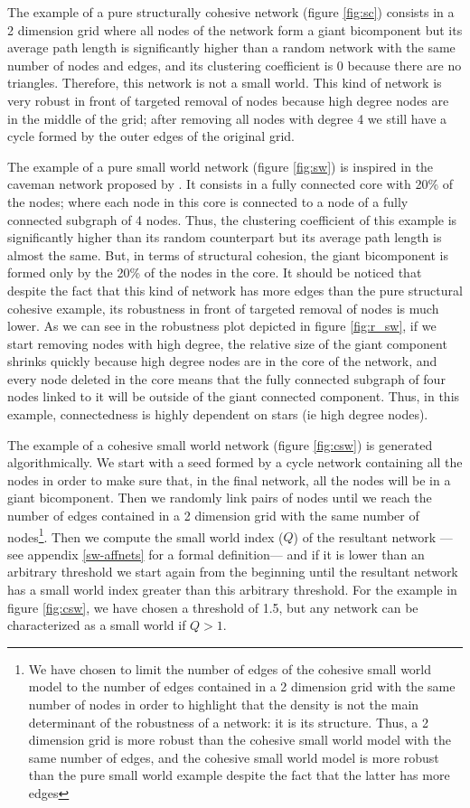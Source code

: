 The example of a pure structurally cohesive network (figure \ref{fig:sc}) consists in a 2 dimension grid where all nodes of the network form a giant bicomponent but its average path length is significantly higher than a random network with the same number of nodes and edges, and its clustering coefficient is 0 because there are no triangles. Therefore, this network is not a small world. This kind of network is very robust in front of targeted removal of nodes because high degree nodes are in the middle of the grid; after removing all nodes with degree 4 we still have a cycle formed by the outer edges of the original grid.

The example of a pure small world network (figure \ref{fig:sw}) is inspired in the caveman network proposed by \cite{watts:1999}. It consists in a fully connected core with 20\% of the nodes; where each node in this core is connected to a node of a fully connected subgraph of 4 nodes. Thus, the clustering coefficient of this example is significantly higher than its random counterpart but its average path length is almost the same. But, in terms of structural cohesion, the giant bicomponent is formed only by the 20\% of the nodes in the core. It should be noticed that despite the fact that this kind of network has more edges than the pure structural cohesive example, its robustness in front of targeted removal of nodes is much lower. As we can see in the robustness plot depicted in figure \ref{fig:r_sw}, if we start removing nodes with high degree, the relative size of the giant component shrinks quickly because high degree nodes are in the core of the network, and every node deleted in the core means that the fully connected subgraph of four nodes linked to it will be outside of the giant connected component. Thus, in this example, connectedness is highly dependent on stars (ie high degree nodes).

The example of a cohesive small world network (figure \ref{fig:csw}) is generated algorithmically. We start with a seed formed by a cycle network containing all the nodes in order to make sure that, in the final network, all the nodes will be in a giant bicomponent. Then we randomly link pairs of nodes until we reach the number of edges contained in a 2 dimension grid with the same number of nodes\footnote{We have chosen to limit the number of edges of the cohesive small world model to the number of edges contained in a 2 dimension grid with the same number of nodes in order to highlight that the density is not the main determinant of the robustness of a network: it is its structure. Thus, a 2 dimension grid is more robust than the cohesive small world model with the same number of edges, and the cohesive small world model is more robust than the pure small world example despite the fact that the latter has more edges}. Then we compute the small world index ($Q$) of the resultant network ---see appendix \ref{sw-affnets} for a formal definition--- and if it is lower than an arbitrary threshold we start again from the beginning until the resultant network has a small world index greater than this arbitrary threshold. For the example in figure \ref{fig:csw}, we have chosen a threshold of 1.5, but any network can be characterized as a small world if $Q > 1$.


